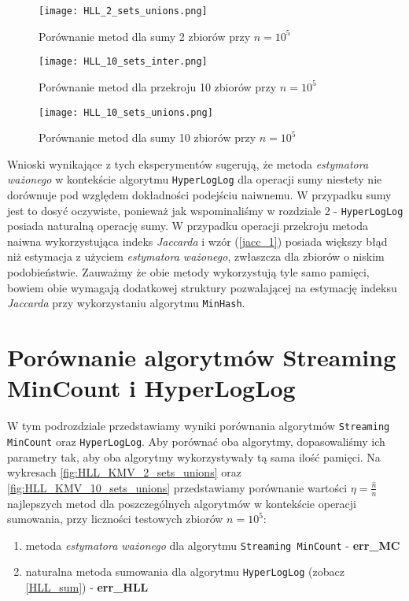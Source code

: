\begin{figure}[h!]
	\texttt{[image: HLL\_2\_sets\_unions.png]}
	\centering
	\caption{Porównanie metod dla sumy 2 zbiorów przy $n=10^5$}
	\label{fig:HLL_2_sets_unions}
\end{figure}

\begin{figure}[h!]
    \texttt{[image: HLL\_10\_sets\_inter.png]}
    \centering
    \caption{Porównanie metod dla przekroju 10 zbiorów przy $n=10^5$}
    \label{fig:HLL_10_sets_inter}
\end{figure}

\begin{figure}[h!]
    \texttt{[image: HLL\_10\_sets\_unions.png]}
    \centering
    \caption{Porównanie metod dla sumy 10 zbiorów przy $n=10^5$}
    \label{fig:HLL_10_sets_unions}
\end{figure}

Wnioski wynikające z tych eksperymentów sugerują, że metoda \textit{estymatora ważonego} w kontekście algorytmu \texttt{HyperLogLog} dla operacji sumy niestety nie dorównuje pod względem dokładności podejściu naiwnemu. W przypadku sumy jest to dosyć oczywiste, ponieważ jak wspominaliśmy w rozdziale 2 - \texttt{HyperLogLog} posiada naturalną operację sumy. W przypadku operacji przekroju metoda naiwna wykorzystująca indeks \textit{Jaccarda} i wzór (\ref{jacc_1}) posiada większy błąd niż estymacja z użyciem \textit{estymatora ważonego}, zwłaszcza dla zbiorów o niskim podobieństwie. Zauważmy że obie metody wykorzystują tyle samo pamięci, bowiem obie wymagają dodatkowej struktury pozwalającej na estymację indeksu \textit{Jaccarda} przy wykorzystaniu algorytmu \texttt{MinHash}.

\section{Porównanie algorytmów Streaming MinCount i HyperLogLog}

W tym podrozdziale przedstawiamy wyniki porównania algorytmów \texttt{Streaming MinCount} oraz \texttt{HyperLogLog}. Aby porównać oba algorytmy, dopasowaliśmy ich parametry tak, aby oba algorytmy wykorzystywały tą sama ilość pamięci. Na wykresach \ref{fig:HLL_KMV_2_sets_unions} oraz \ref{fig:HLL_KMV_10_sets_unions} przedstawiamy porównanie wartości $\eta = \frac{\hat{n}}{n}$ najlepszych metod dla poszczególnych algorytmów w kontekście operacji sumowania, przy liczności testowych zbiorów $n=10^5$:
\begin{enumerate}
	\item metoda \textit{estymatora ważonego} dla algorytmu \texttt{Streaming MinCount} - \textbf{err\_MC}
	\item naturalna metoda sumowania dla algorytmu \texttt{HyperLogLog} (zobacz \ref{HLL_sum}) - \textbf{err\_HLL}
\end{enumerate}

